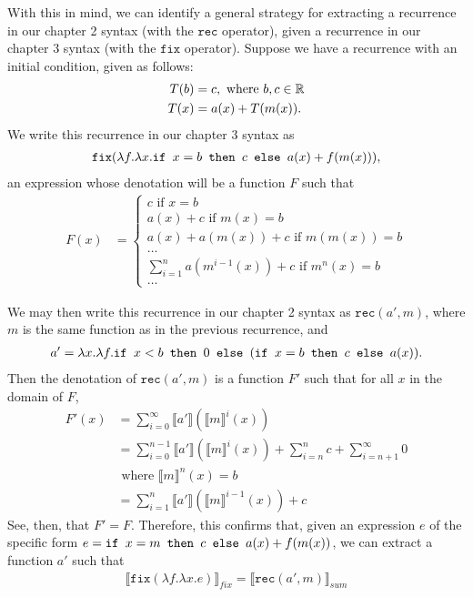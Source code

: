 With this in mind, we can identify a general strategy for extracting a recurrence in our chapter 2 syntax (with
the $\texttt{rec}$ operator), given a recurrence in our chapter 3 syntax (with the $\texttt{fix}$ operator). 
Suppose we have a recurrence with an initial condition, given as follows:
\begin{align*}
T(b) &= c, \text{ where } b, c  \in \mathbb{R} \\
T(x) &= a(x) + T(m(x)).
\end{align*}
We write this recurrence in our chapter 3 syntax as 
\begin{align*}
\texttt{fix}(\lambda f.\lambda x. \texttt{if } x = b \texttt{ then } c \texttt{ else } a(x) + f(m(x))),
\end{align*}
an expression whose denotation will be a function $F$ such that
\begin{align*}
F(x) &=
\begin{cases}
c \text{ if } x = b \\
a(x) + c \text{ if } m(x) = b \\
a(x) + a(m(x)) + c \text{ if } m(m(x)) = b \\
\ldots \\
\sum_{i=1}^{n} a(m^{i-1}(x)) + c \text{ if } m^n(x) = b \\
\ldots
\end{cases}
\end{align*}

We may then write this recurrence in our chapter 2 syntax as $\texttt{rec}(a',m)$, where $m$ is the same function
as in the previous recurrence, and
\begin{align*}
a' = \lambda x.\lambda f. \texttt{if } x < b \texttt{ then } 0 \texttt{ else } (\texttt{if } x = b \texttt{ then } c \texttt{ else } a(x)).
\end{align*}
Then the denotation of $\texttt{rec}(a',m)$ is a function $F'$ such that for all $x$ in the domain of $F$, 
\begin{align*}
F'(x) &= \sum_{i=0}^{\infty} \llbracket a' \rrbracket(\llbracket m \rrbracket^i(x)) \\
&= \sum_{i=0}^{n-1} \llbracket a' \rrbracket( \llbracket m \rrbracket^i(x)) + \sum_{i=n}^n c + \sum_{i = n+1}^{\infty} 0 \\
&\text{ where } \llbracket m \rrbracket^n(x) = b \\
&= \sum_{i=1}^{n}\llbracket a' \rrbracket ( \llbracket m \rrbracket^{i-1}(x)) + c
\end{align*}
See, then, that $F' = F$. Therefore, this confirms that, given an expression $e$ of the specific form
$e = \texttt{if } x = m \texttt{ then } c \texttt{ else } a(x) + f(m(x))$, we can extract a function $a'$ such that 
\begin{align*}
\llbracket \texttt{fix}(\lambda f. \lambda x.e) \rrbracket_{fix} = \llbracket \texttt{rec}(a',m)\rrbracket_{sum}
\end{align*}





 